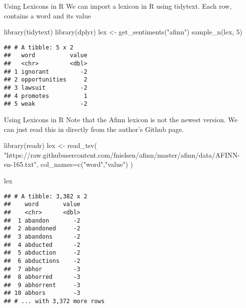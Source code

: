 \documentclass[
  10pt,
  ignorenonframetext,
  aspectratio=169]{beamer}
\newenvironment{Shaded}{\begin{snugshade}}{\end{snugshade}}
\newcommand{\AttributeTok}[1]{\textcolor[rgb]{0.80,0.80,0.80}{#1}}
\newcommand{\DecValTok}[1]{\textcolor[rgb]{0.86,0.86,0.80}{#1}}
\newcommand{\FunctionTok}[1]{\textcolor[rgb]{0.94,0.94,0.56}{#1}}
\newcommand{\NormalTok}[1]{\textcolor[rgb]{0.80,0.80,0.80}{#1}}
\newcommand{\OtherTok}[1]{\textcolor[rgb]{0.94,0.94,0.56}{#1}}
\newcommand{\StringTok}[1]{\textcolor[rgb]{0.80,0.58,0.58}{#1}}
\begin{document}
\begin{frame}[fragile]{Using Lexicons in R}
\protect\hypertarget{using-lexicons-in-r}{}
We can import a lexicon in R using tidytext. Each row, contains a word
and its value

\medskip

\begin{Shaded}
\begin{Highlighting}[]
\FunctionTok{library}\NormalTok{(tidytext)}
\FunctionTok{library}\NormalTok{(dplyr)}
\NormalTok{lex }\OtherTok{\textless{}{-}} \FunctionTok{get\_sentiments}\NormalTok{(}\StringTok{"afinn"}\NormalTok{)}
\FunctionTok{sample\_n}\NormalTok{(lex, }\DecValTok{5}\NormalTok{)}
\end{Highlighting}
\end{Shaded}

\begin{verbatim}
## # A tibble: 5 x 2
##   word          value
##   <chr>         <dbl>
## 1 ignorant         -2
## 2 opportunities     2
## 3 lawsuit          -2
## 4 promotes          1
## 5 weak             -2
\end{verbatim}
\end{frame}

\begin{frame}[fragile]{Using Lexicons in R}
\protect\hypertarget{using-lexicons-in-r-1}{}
Note that the Afinn lexicon is not the newest version. We can just read
this in directly from the author's Github page.

\medskip

\begin{Shaded}
\begin{Highlighting}[]
\FunctionTok{library}\NormalTok{(readr)}
\NormalTok{lex }\OtherTok{\textless{}{-}} \FunctionTok{read\_tsv}\NormalTok{(}
  \StringTok{"https://raw.githubusercontent.com/fnielsen/afinn/master/afinn/data/AFINN{-}en{-}165.txt"}\NormalTok{,}
  \AttributeTok{col\_names=}\FunctionTok{c}\NormalTok{(}\StringTok{"word"}\NormalTok{,}\StringTok{"value"}\NormalTok{)}
\NormalTok{)}

\NormalTok{lex}
\end{Highlighting}
\end{Shaded}

\begin{verbatim}
## # A tibble: 3,382 x 2
##    word       value
##    <chr>      <dbl>
##  1 abandon       -2
##  2 abandoned     -2
##  3 abandons      -2
##  4 abducted      -2
##  5 abduction     -2
##  6 abductions    -2
##  7 abhor         -3
##  8 abhorred      -3
##  9 abhorrent     -3
## 10 abhors        -3
## # ... with 3,372 more rows
\end{verbatim}
\end{frame}
\end{document}
